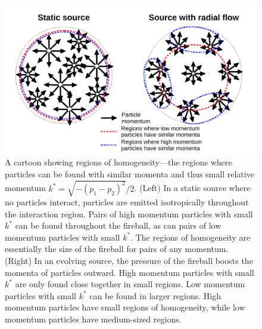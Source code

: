 \begin{figure}[hbt]
\includegraphics[width=36pc]{Figures/HomemadeFigures/RegionsOfHomogeneity.pdf}
\caption[Regions of homogeneity]{A cartoon showing regions of homogeneity---the regions where particles can be found with similar momenta and thus small relative momentum $k^* = \sqrt{-(p_1 - p_2)^2}/2$.
(Left) In a static source where no particles interact, particles are emitted isotropically throughout the interaction region.
Pairs of high momentum particles with small $k^*$ can be found throughout the fireball, as can pairs of low momentum particles with small $k^*$.
The regions of homogeneity are essentially the size of the fireball for pairs of any momentum.
(Right) In an evolving source, the pressure of the fireball boosts the momenta of particles outward.
High momentum particles with small $k^*$ are only found close together in small regions.
Low momentum particles with small $k^*$ can be found in larger regions.
High momentum particles have small regions of homogeneity, while low momentum particles have medium-sized regions.}
\label{fig:RegionsOfHomogeneity}
\end{figure}


